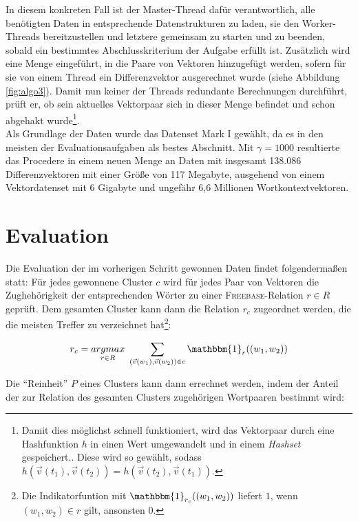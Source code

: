 In diesem konkreten Fall ist der Master-Thread dafür verantwortlich, alle benötigten Daten in entsprechende Datenstrukturen
zu laden, sie den Worker-Threads bereitzustellen und letztere gemeinsam zu starten und zu beenden, sobald ein bestimmtes
Abschlusskriterium der Aufgabe erfüllt ist.
Zusätzlich wird eine Menge eingeführt, in die Paare von Vektoren hinzugefügt werden, sofern für sie von einem Thread
ein Differenzvektor ausgerechnet wurde (siehe Abbildung \ref{fig:algo3}). Damit nun keiner der Threads redundante Berechnungen durchführt, prüft er, ob sein
aktuelles Vektorpaar sich in dieser Menge befindet und schon abgehakt wurde\footnote{Damit dies möglichst schnell funktioniert,
wird das Vektorpaar durch eine Hashfunktion $h$ in einen Wert umgewandelt und in einem \emph{Hashset} gespeichert.. Diese wird so gewählt,
sodass $h(\vec{v}(t_1), \vec{v}(t_2)) = h(\vec{v}(t_2), \vec{v}(t_1))$.}.\\

Als Grundlage der Daten wurde das Datenset Mark I gewählt, da es in den meisten der Evaluationsaufgaben
als bestes Abschnitt. Mit $\gamma = 1000$ resultierte das Procedere in einem neuen Menge an Daten mit insgesamt
138.086 Differenzvektoren mit einer Größe von 117 Megabyte, ausgehend von einem Vektordatenset mit 6 Gigabyte und
ungefähr 6,6 Millionen Wortkontextvektoren.\\

\section{Evaluation}

Die Evaluation der im vorherigen Schritt gewonnen Daten findet folgendermaßen statt: Für jedes gewonnene Cluster $c$ wird für
jedes Paar von Vektoren die Zughehörigkeit der entsprechenden Wörter zu einer \textsc{Freebase}-Relation $r \in R$ geprüft.
Dem gesamten Cluster kann dann die Relation $r_c$ zugeordnet werden, die die meisten Treffer zu verzeichnet hat\footnote{Die Indikatorfuntion mit $\mathbbm{1}_{r_c}((w_1, w_2))$ liefert $1$, wenn
$(w_1, w_2) \in r$ gilt, ansonsten $0$.}:

\begin{equation}
    r_c = \underset{r \in R}{argmax}\ \sum_{(\vec{v}(w_1), \vec{v}(w_2)) \in c}  \mathbbm{1}_{r}((w_1, w_2))
\end{equation}

Die ``Reinheit'' $P$ eines Clusters kann dann errechnet werden, indem der Anteil der zur Relation des gesamten Clusters
zugehörigen Wortpaaren bestimmt wird:

